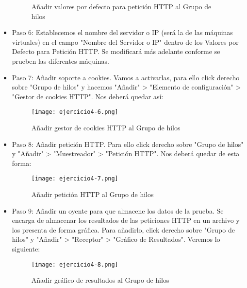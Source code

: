 \begin{itemize}
\begin{figure}[H]
				\label{figura23} 
				\caption{Añadir valores por defecto para petición HTTP al Grupo de hilos}
			\end{figure}
		\item Paso 6: Establecemos el nombre del servidor o IP (será la de las máquinas virtuales) en el campo  "Nombre del Servidor o IP" dentro de los Valores por Defecto para Petición HTTP. Se modificará más adelante conforme se prueben las diferentes máquinas.
		\item Paso 7: Añadir soporte a cookies. Vamos a activarlas, para ello click derecho sobre "Grupo de hilos" y hacemos "Añadir" >  "Elemento de configuración" > "Gestor de cookies HTTP". Nos deberá quedar así:
			\begin{figure}[H] 
				\centering
				\texttt{[image: ejercicio4-6.png]} 
				\label{figura24} 
				\caption{Añadir gestor de cookies HTTP al Grupo de hilos}
			\end{figure}
		\item Paso 8: Añadir petición HTTP. Para ello click derecho sobre "Grupo de hilos" y "Añadir" > "Muestreador" > "Petición HTTP". Nos deberá quedar de esta forma:
			\begin{figure}[H] 
				\centering
				\texttt{[image: ejercicio4-7.png]} 
				\label{figura25} 
				\caption{Añadir petición HTTP al Grupo de hilos}
			\end{figure}
		\item Paso 9: Añadir un oyente para que almacene los datos de la prueba. Se encarga de almacenar los resultados de las peticiones HTTP en un archivo y los presenta de forma gráfica. Para añadirlo, click derecho sobre "Grupo de hilos" y "Añadir" > "Receptor" > "Gráfico de Resultados". Veremos lo siguiente:
			\begin{figure}[H] 
				\centering
				\texttt{[image: ejercicio4-8.png]} 
				\label{figura26} 
				\caption{Añadir gráfico de resultados al Grupo de hilos}
			\end{figure}
	\end{itemize}
	
